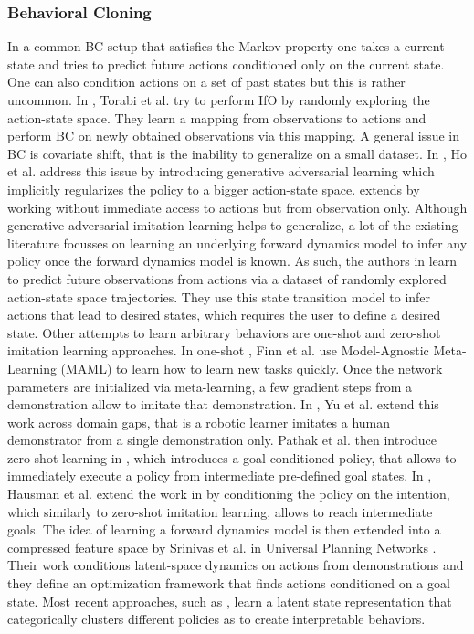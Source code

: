 \subsubsection{Behavioral Cloning}
In a common BC setup that satisfies the Markov property one takes a current state and tries to predict future actions conditioned only on the current state. One can also condition actions on a set of past states \cite{xu2017end} but this is rather uncommon. In \cite{torabi2018behavioral}, Torabi et al. try to perform IfO by randomly exploring the action-state space. They learn a mapping from observations to actions and perform BC on newly obtained observations via this mapping. A general issue in BC is covariate shift, that is the inability to generalize on a small dataset. In \cite{ho2016generative}, Ho et al. address this issue by introducing generative adversarial learning which implicitly regularizes the policy to a bigger action-state space. \cite{torabi2018generative} extends \cite{ho2016generative} by working without immediate access to actions but from observation only. Although generative adversarial imitation learning helps to generalize, a lot of the existing literature focusses on learning an underlying forward dynamics model to infer any policy once the forward dynamics model is known. As such, the authors in \cite{finn2016unsupervised, finn2017deep, nair2017combining} learn to predict future observations from actions via a dataset of randomly explored action-state space trajectories. They use this state transition model to infer actions that lead to desired states, which requires the user to define a desired state. Other attempts to learn arbitrary behaviors are one-shot and zero-shot imitation learning approaches. In one-shot \cite{finn2017one}, Finn et al. use Model-Agnostic Meta-Learning (MAML) to learn how to learn new tasks quickly. Once the network parameters are initialized via meta-learning, a few gradient steps from a demonstration allow to imitate that demonstration. In \cite{yu2018one}, Yu et al. extend this work across domain gaps, that is a robotic learner imitates a human demonstrator from a single demonstration only. Pathak et al. then introduce zero-shot learning in \cite{pathak2018zero}, which introduces a goal conditioned policy, that allows to immediately execute a policy from intermediate pre-defined goal states. In \cite{hausman2017multi}, Hausman et al. extend the work in \cite{ho2016generative} by conditioning the policy on the intention, which similarly to zero-shot imitation learning, allows to reach intermediate goals. The idea of learning a forward dynamics model is then extended into a compressed feature space by Srinivas et al. in Universal Planning Networks \cite{srinivas2018universal}. Their work conditions latent-space dynamics on actions from demonstrations and they define an optimization framework that finds actions conditioned on a goal state. Most recent approaches, such as \cite{lynch2020learning}, learn a latent state representation that categorically clusters different policies as to create interpretable behaviors.


